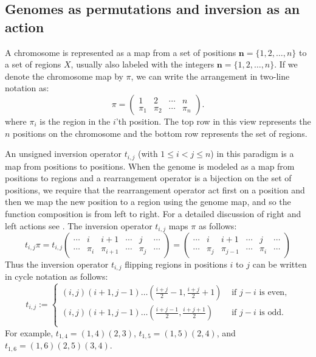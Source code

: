 \documentclass[12pt,a4paper]{amsart}
\newcommand{\tij}[1]{t_{#1}}
\newcommand{\n}{\mathbf n}
\numberwithin{equation}{section}
\begin{document}
\medskip
\subsection*{Genomes as permutations and inversion as an action}

A chromosome is represented as a map from a set of positions $\n=\{ 1,2,\dots,n\}$ to a set of regions $X$, usually also labeled with the integers $\n=\{1,2,\dots,n\}$. If we denote the chromosome map by $\pi$, we can write the arrangement in two-line notation as:
\[
\pi=\begin{pmatrix}
1 & 2 & \cdots & n\\
\pi_1 & \pi_2 & \cdots & \pi_n
\end{pmatrix}.
\]
where $\pi_i$ is the region in the $i$'th position. The top row in this view represents the $n$ positions on the chromosome and the bottom row represents the set of regions.  


An unsigned inversion operator $\tij{i,j}$ (with $1\le i<j\le n$) in this paradigm is a map from positions to positions. 
When the genome is modeled as a map from positions to regions and a rearrangement operator is a bijection on the set of positions, we require that the rearrangement operator act first on a position and then we map the new position to a region using the genome map,
and so the function composition is from left to right. For a detailed discussion of right and left actions see \citet{bhatia2018position}. The inversion operator $\tij{i,j}$ maps $\pi$ as follows:
\[
\tij{i,j}\pi=
\tij{i,j} \begin{pmatrix}
\cdots & i     & i+1       & \cdots & j     & \cdots\\
\cdots & \pi_i & \pi_{i+1} & \cdots & \pi_j & \cdots
\end{pmatrix} =  
\begin{pmatrix}
\cdots & i & i+1 & \cdots & j & \cdots\\
\cdots & \pi_j & \pi_{j-1} & \cdots & \pi_i & \cdots
\end{pmatrix}
\]
Thus the inversion operator $\tij{i,j}$ flipping regions in positions $i$ to $j$ can be written in cycle notation as follows:
\[ \tij{i,j} := 
\begin{cases}
(i,j)(i+1, j-1)\dots (\frac{i+j}{2} - 1, \frac{i+j}{2} + 1) & \text{ if } j -i \text{ is even,} \\
(i,j)(i+1, j-1)\dots (\frac{i+j-1}{2}, \frac{i+j+1}{2}) & \text{ if } j -i \text{ is odd.} \\
\end{cases} \]
%
For example, $t_{1,4}=(1,4)(2,3)$, $t_{1,5}=(1, 5)(2, 4)$, and $t_{1,6} = (1, 6)(2, 5)(3, 4)$.
\end{document}
